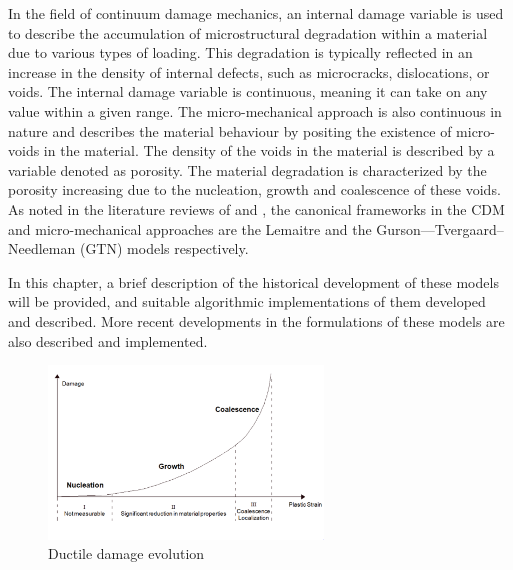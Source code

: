\documentclass[sn-mathphys,Numbered,draft]{sn-jnl}%
\begin{document}
In the field of continuum damage mechanics, an internal damage variable is used to describe the accumulation of microstructural degradation within a material due to various types of loading. This degradation is typically reflected in an increase in the density of internal defects, such as microcracks, dislocations, or voids. The internal damage variable is continuous, meaning it can take on any value within a given range. The micro-mechanical approach is also continuous in nature and describes the material behaviour by positing the existence of micro-voids in the material. The density of the voids in the material is described by a variable denoted as porosity. The material degradation is characterized by the porosity increasing due to the nucleation, growth and coalescence of these voids. As noted in the literature reviews of \citet{besson_continuum_2010, cao_models_2017} and \citet{tekkaya_damage_2020}, the canonical frameworks in the CDM and micro-mechanical approaches are the Lemaitre \cite{lemaitre_continuous_1985,lemaitre_engineering_2005} and the Gurson—Tvergaard–Needleman (GTN) \cite{gurson_continuum_1977,tvergaard_analysis_1984} models respectively.

In this chapter, a brief description of the historical development of these models will be provided, and suitable algorithmic implementations of them developed and described. More recent developments in the formulations of these models are also described and implemented. 

\begin{figure}[htb]
\begin{center}
	\includegraphics[width=0.65\textwidth]{./Figures/damageModels/ductileDamageEvolution.png}
\caption{Ductile damage evolution \cite{teixeira_ductile_2010}}
\label{fig:Ductile-damage-evolution}
\end{center}
\end{figure}
\end{document}
